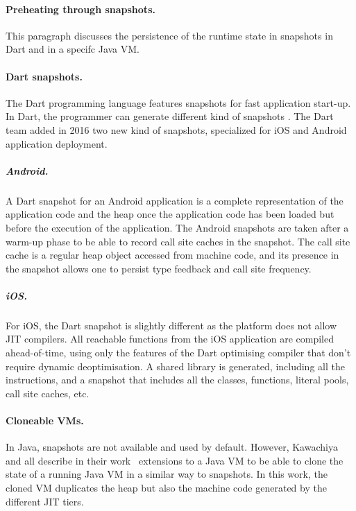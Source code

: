 \documentclass[a4paper,12pt,twoside]{../includes/ThesisStyle}
\begin{document}
\paragraph{Preheating through snapshots.} This paragraph discusses the persistence of the runtime state in snapshots in Dart and in a specifc Java VM.

\paragraph{Dart snapshots.}
The Dart programming language features snapshots for fast application start-up. In Dart, the programmer can generate different kind of snapshots \cite{Anna13a}. The Dart team added in 2016 two new kind of snapshots, specialized for iOS and Android application deployment.

\subparagraph{Android.} A Dart snapshot for an Android application is a complete representation of the application code and the heap once the application code has been loaded but before the execution of the application. The Android snapshots are taken after a warm-up phase to be able to record call site caches in the snapshot. The call site cache is a regular heap object accessed from machine code, and its presence in the snapshot allows one to persist type feedback and call site frequency. %

\subparagraph{iOS.} For iOS, the Dart snapshot is slightly different as the platform does not allow JIT compilers. All reachable functions from the iOS application are compiled ahead-of-time, using only the features of the Dart optimising compiler that don't require dynamic deoptimisation. A shared library is generated, including all the instructions, and a snapshot that includes all the classes, functions, literal pools, call site caches, etc.

\paragraph{Cloneable VMs.}
In Java, snapshots are not available and used by default. However, Kawachiya and all describe in their work~\cite{Kawa07a} extensions to a Java VM to be able to clone the state of a running Java VM in a similar way to snapshots. In this work, the cloned VM duplicates the heap but also the machine code generated by the different JIT tiers.

\end{document}
